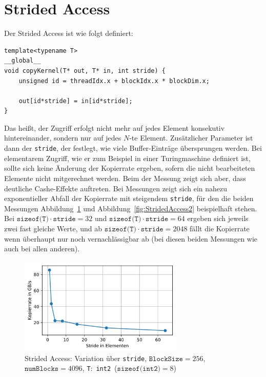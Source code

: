 \documentclass[11pt, abstract=on]{scrartcl}
\begin{document}
\section{Strided Access}
Der Strided Access ist wie folgt definiert:

\begin{lstlisting} 
template<typename T>
__global__
void copyKernel(T* out, T* in, int stride) {
	unsigned id = threadIdx.x + blockIdx.x * blockDim.x;
		
	out[id*stride] = in[id*stride];
}
\end{lstlisting}

Das heißt, der Zugriff erfolgt nicht mehr auf jedes Element konsekutiv hintereinander, sondern nur auf jedes $N$-te Element. Zusätzlicher Parameter ist dann der \texttt{stride}, der festlegt, wie viele Buffer-Einträge übersprungen werden. Bei elementarem Zugriff, wie er zum Beispiel in einer Turingmaschine definiert ist, sollte sich keine Änderung der Kopierrate ergeben, sofern die nicht bearbeiteten Elemente nicht mitgerechnet werden. Beim der Messung zeigt sich aber, dass deutliche Cashe-Effekte auftreten. Bei Messungen zeigt sich ein nahezu exponentieller Abfall der Kopierrate mit steigendem \texttt{stride}, für den die beiden Messungen Abbildung~\ref{fig:StridedAccess1} und Abbildung~\ref{fig:StridedAccess2} beispielhaft stehen. Bei $\texttt{sizeof(T)} \cdot \texttt{stride} = 32$ und $\texttt{sizeof(T)} \cdot \texttt{stride} = 64$ ergeben sich jeweils zwei fast gleiche Werte, und ab $\texttt{sizeof(T)} \cdot \texttt{stride} = 2048$ fällt die Kopierrate wenn überhaupt nur noch vernachlässigbar ab (bei diesen beiden Messungen wie auch bei allen anderen).

\begin{figure} [htbp]
 	\centering
 		\includegraphics[width=0.7\textwidth]{Graph_StridedAccess1.png}
 	\caption{Strided Access: Variation über \texttt{stride}, $\texttt{BlockSize} = 256$, $\texttt{numBlocks} = 4096$, \texttt{T}:~\texttt{int2}~($\texttt{sizeof(int2)} = 8$)}
 	\label{fig:StridedAccess1}
\end{figure}
\end{document}
